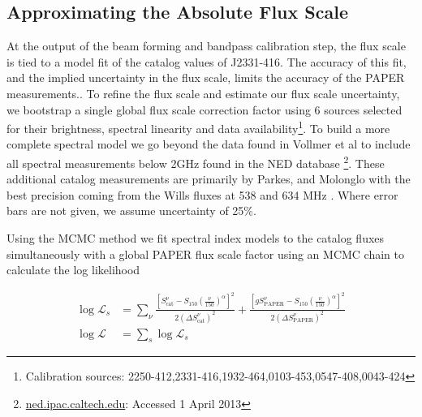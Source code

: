 \documentclass[preprint]{aastex}
\newcommand{\PAPER}{\mathrm{PAPER}}
\begin{document}
\subsection{Approximating the Absolute Flux Scale}
\label{sec:flux_scale}

At the output of the beam forming and bandpass calibration step, the flux scale
 is tied to a model fit of the catalog values of
J2331-416. The accuracy of this fit, and the implied uncertainty in the flux
scale, limits the accuracy of the PAPER measurements..  To refine the flux
scale and estimate our flux scale uncertainty, we bootstrap a single global flux scale 
correction factor using 6
sources selected for their brightness, spectral linearity and data
availability\footnote{Calibration sources:
2250-412,2331-416,1932-464,0103-453,0547-408,0043-424}. To build a more complete
spectral model we go beyond the data found in Vollmer et al to include all spectral
measurements below 2GHz found in the NED database \footnote{\url{ned.ipac.caltech.edu}: Accessed 1 April 2013}.  These additional
 catalog measurements are primarily by Parkes, and Molonglo  \citep{Kuehr:1981p9323} with the best precision coming from the
Wills fluxes at 538 and 634 MHz \citep{Wills:1975p9314}. Where error bars are not
given, we assume uncertainty of 25\%. 

Using the MCMC method we fit spectral index models to the catalog fluxes
 simultaneously with a global PAPER flux scale factor using  an MCMC chain to calculate the log likelihood

\begin{align}
\log\mathcal{L}_s &= \sum_{\nu}\frac{ \left[S_\textrm{cat}^{\nu}  - S_{150}  \left(\frac{\nu}{150}\right)^\alpha\right]^2}{2(\Delta S_\textrm{cat}^\nu)^2} +
\frac{ \left[g S_\PAPER^{\nu}  - S_{150}\left(\frac{\nu}{150}\right)^\alpha\right]^2}{2(\Delta S_\PAPER^\nu)^2} \nonumber \\
\log\mathcal{L} &= \sum_{s} \log\mathcal{L}_s
\end{align}
\end{document}
